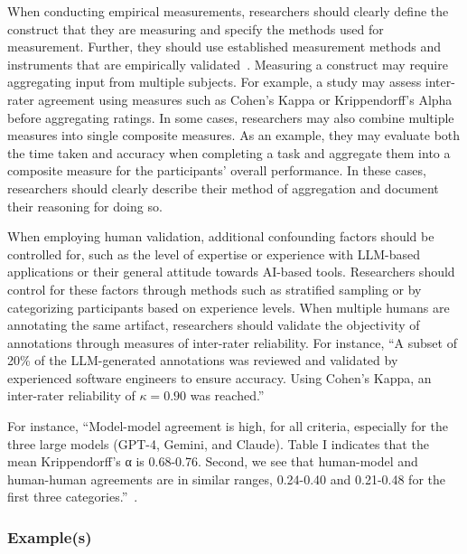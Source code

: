 When conducting empirical measurements, researchers should clearly define the construct that they are measuring and specify the methods used for measurement. 
Further, they should use established measurement methods and instruments that are empirically validated~\cite{DBLP:journals/fcomp/HoffmanMKL23, DBLP:conf/chi/PerrigSB23}.
Measuring a construct may require aggregating input from multiple subjects. 
For example, a study may assess inter-rater agreement using measures such as Cohen's Kappa or Krippendorff’s Alpha before aggregating ratings.
In some cases, researchers may also combine multiple measures into single composite measures.
As an example, they may evaluate both the time taken and accuracy when completing a task and aggregate them into a composite measure for the participants' overall performance.
In these cases, researchers should clearly describe their method of aggregation and document their reasoning for doing so.

When employing human validation, additional confounding factors should be controlled for, such as the level of expertise or experience with LLM-based applications or their general attitude towards AI-based tools.
Researchers should control for these factors through methods such as stratified sampling or by categorizing participants based on experience levels.
When multiple humans are annotating the same artifact, researchers should validate the objectivity of annotations through measures of inter-rater reliability.
For instance, ``A subset of 20\% of the LLM-generated annotations was reviewed and validated by experienced software engineers to ensure accuracy. Using Cohen's Kappa, an inter-rater reliability of $\kappa = 0.90$ was reached.''

For instance, ``Model-model agreement is high, for all criteria, especially for the three large models (GPT-4, Gemini, and Claude). Table I indicates that the mean Krippendorff’s α is 0.68-0.76. 
Second, we see that human-model and human-human agreements are in similar ranges, 0.24-0.40 and 0.21-0.48
for the first three categories.''~\cite{DBLP:journals/corr/abs-2408-05534}.

\subsubsection{Example(s)}

